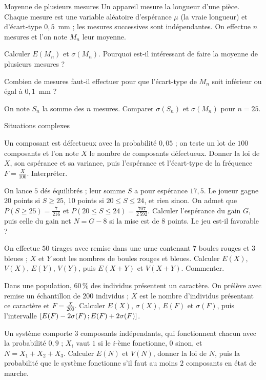 \begin{exercice}[2]{Moyenne de plusieurs mesures}
Un appareil mesure la longueur d'une pièce. Chaque mesure est une variable aléatoire d'espérance $\mu$ (la vraie longueur) et
d'écart-type $0{,}5$~mm ; les mesures successives sont indépendantes. On effectue $n$ mesures et l'on note $M_n$ leur moyenne.
\begin{questions}
  \item Calculer $E(M_n)$ et $\sigma(M_n)$. Pourquoi est-il intéressant de faire la moyenne de plusieurs mesures ?
  \item Combien de mesures faut-il effectuer pour que l'écart-type de $M_n$ soit inférieur ou égal à $0{,}1$~mm ?
  \item On note $S_n$ la somme des $n$ mesures. Comparer $\sigma(S_n)$ et $\sigma(M_n)$ pour $n=25$.
\end{questions}
\end{exercice}


\begin{exercice}[3]{Situations complexes}
\begin{questions}
  \item Un composant est défectueux avec la probabilité $0{,}05$ ; on teste un lot de $100$ composants et l'on note $X$ le nombre de
    composants défectueux. Donner la loi de $X$, son espérance et sa variance, puis l'espérance et l'écart-type de la fréquence
    $F=\frac{X}{100}$. Interpréter.
  \item On lance $5$ dés équilibrés ; leur somme $S$ a pour espérance $17{,}5$. Le joueur gagne $20$ points si $S\geq25$, $10$ points
    si $20\leq S\leq24$, et rien sinon. On admet que $P(S\geq25)=\frac{7}{216}$ et $P(20\leq S\leq24)=\frac{707}{2\,592}$. Calculer
    l'espérance du gain $G$, puis celle du gain net $N=G-8$ si la mise est de $8$ points. Le jeu est-il favorable ?
  \item On effectue $50$ tirages avec remise dans une urne contenant $7$ boules rouges et $3$ bleues ; $X$ et $Y$ sont les nombres de
    boules rouges et bleues. Calculer $E(X)$, $V(X)$, $E(Y)$, $V(Y)$, puis $E(X+Y)$ et $V(X+Y)$. Commenter.
  \item Dans une population, 60\,\% des individus présentent un caractère. On prélève avec remise un échantillon de $200$ individus ;
    $X$ est le nombre d'individus présentant ce caractère et $F=\frac{X}{200}$. Calculer $E(X)$, $\sigma(X)$, $E(F)$ et $\sigma(F)$,
    puis l'intervalle $\mathopen{[}E(F)-2\sigma(F)\,{;}\,E(F)+2\sigma(F)\mathclose{]}$.
  \item Un système comporte $3$ composants indépendants, qui fonctionnent chacun avec la probabilité $0{,}9$ ; $X_i$ vaut $1$ si le
    $i$-ème fonctionne, $0$ sinon, et $N=X_1+X_2+X_3$. Calculer $E(N)$ et $V(N)$, donner la loi de $N$, puis la probabilité que le
    système fonctionne s'il faut au moins $2$ composants en état de marche.
\end{questions}
\end{exercice}

